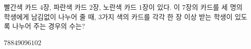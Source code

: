 빨간색 카드 $4$장, 파란색 카드 $2$장, 노란색 카드 $1$장이 있다. 이 $7$장의 카드를 세 명의 학생에게 남김없이 나누어 줄 때, \mbox{$3$가지} 색의 카드를 각각 한 장 이상 받는 학생이 있도록 나누어 주는 경우의 수는? 
\begin{choices32}{$78$}{$84$}{$90$}{$96$}{$102$}\end{choices32}
